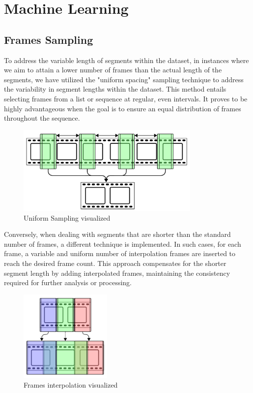 \chapter{Machine Learning}

\section{Frames Sampling}
To address the variable length of segments within the dataset, in instances where we aim to attain a lower number of frames than the actual length of the segments, 
we have utilized the "uniform spacing" sampling technique to address the variability in segment lengths within the dataset.
This method entails selecting frames from a list or sequence at regular, even intervals. 
It proves to be highly advantageous when the goal is to ensure an equal distribution of frames throughout the sequence.

\begin{figure}[H]
    \centering
    \includegraphics[width=0.8\textwidth]{graphics/subSampling.png}
    \caption{Uniform Sampling visualized}
    \label{fig:unif_sampling}
\end{figure}

Conversely, when dealing with segments that are shorter than the standard number of frames, a different technique is implemented.
In such cases, for each frame, a variable and uniform number of interpolation frames are inserted to reach the desired frame count. 
This approach compensates for the shorter segment length by adding interpolated frames, maintaining the consistency required for further analysis or processing.
\begin{figure}[H]
    \centering
    \includegraphics[width=0.4\textwidth]{graphics/interpolationSampling.png}
    \caption{Frames interpolation visualized}
    \label{fig:interp_sampling}
\end{figure}

